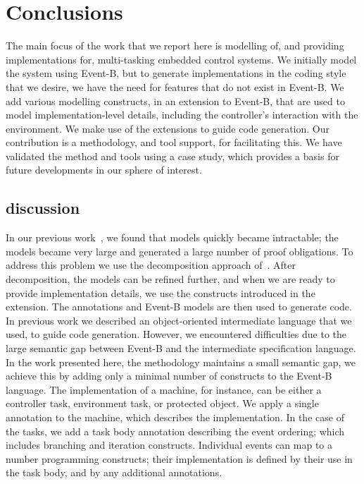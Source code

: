 \section{Conclusions}\label{conclude}
The main focus of the work that we report here is modelling of, and providing implementations for, multi-tasking embedded control systems. We initially model the system using Event-B, but to generate implementations in the coding style that we desire, we have the need for features that do not exist in Event-B. We add various modelling constructs, in an extension to Event-B, that are used to model implementation-level details, including the controller's interaction with the environment. We make use of the extensions to guide code generation. Our contribution is a methodology, and tool support, for facilitating this. We have validated the method and tools using a case study, which provides a basis for future developments in our sphere of interest.

\subsection{discussion}
In our previous work~\cite{Edmunds2009, Edmunds2008, ae2010a}, we found that models quickly became intractable; the models became very large and generated a large number of proof obligations. To address this problem we use the decomposition approach of~\cite{Butler09a, decomp2010b}. After decomposition, the models can be refined further, and when we are ready to provide implementation details, we use the constructs introduced in the extension. The annotations and Event-B models are then used to generate code. In previous work we described an object-oriented intermediate language that we used, to guide code generation. However, we encountered difficulties due to the large semantic gap between Event-B and the intermediate specification language. In the work presented here, the methodology maintains a small semantic gap, we achieve this by adding only a minimal number of constructs to the Event-B language. The implementation of a machine, for instance, can be either a controller task, environment task, or protected object. We apply a single annotation to the machine, which describes the implementation. In the case of the tasks, we add a task body annotation describing the event ordering; which includes branching and iteration constructs. Individual events can map to a number  programming constructs; their implementation is defined by their use in the task body, and by any additional annotations. 

